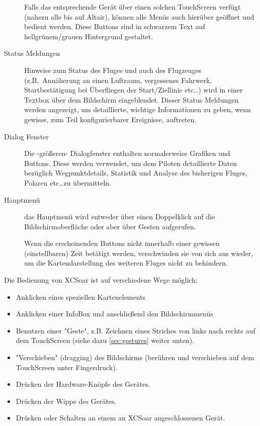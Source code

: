 \begin{description}
Falls das entsprechende Gerät über einen solchen TouchScreen verfügt (nahezu alle bis auf \textsf{Altair}), können alle Menüs auch
hierüber geöffnet und bedient werden. Diese Buttons sind in schwarzem Text auf hellgrünem/grauen Hintergrund gestaltet.
%
\item[Status Meldungen] Hinweise zum Status des Fluges und auch des Flugzeuges  (z.B.\ Annäherung an einen Luftraum, vergessenes Fahrwerk, Startbestätigung bei Überfliegen der Start/Ziellinie etc\dots ) wird in einer Textbox  über dem Bildschirm eingeblendet.
Dieser Status Meldungen werden angezeigt, um detaillierte, wichtige Informationen zu geben, wenn gewisse, zum Teil konfigurierbarer Ereignisse, auftreten.
%
\item[Dialog Fenster] Die -größeren- Dialogfenster enthalten normalerweise Grafiken und Buttons. Diese werden verwendet, um dem Piloten  detaillierte Daten bezüglich Wegpunktdetails, Statistik und Analyse des bisherigen Fluges, Polaren etc\dots  zu übermitteln.

\item[Hauptmenü] das Hauptmenü wird entweder über einen Doppelklick auf die Bildschirmoberfläche oder aber über Gesten  aufgerufen.

   Wenn die erscheinenden Buttons nicht innerhalb einer gewissen (einstellbaren) Zeit  betätigt  werden, verschwinden sie von sich aus wieder, um die Kartendarstellung des weiteren Fluges nicht zu behindern.
\end{description}

Die Bedienung von \textsf{XCSoar} ist auf verschiedene Wege möglich:

\begin{itemize}
\item Anklicken eines speziellen Kartenelements
\item Anklicken einer InfoBox und anschließend den Bildschirmmenüs
\item Benutzen einer "Geste", z.B. Zeichnen eines Striches von links nach rechts auf dem TouchScreen
 (siehe dazu  \ref{sec:gestures} weiter unten).
\item "Verschieben" (dragging) des Bildschirms (berühren und verschieben auf dem TouchScreen unter Fingerdruck).
\item Drücken der Hardware-Knöpfe des  Gerätes.
\item Drücken der Wippe des Gerätes.
\item Drücken  oder Schalten  an einem an \textsf{XCSoar} angeschlossenen Gerät.
\end{itemize}

